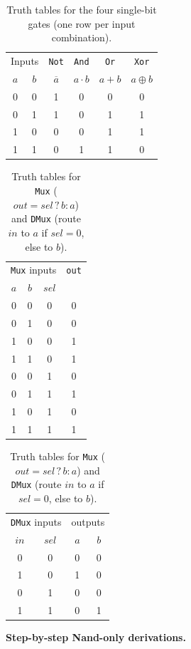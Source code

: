 \documentclass[11pt]{article}
\begin{document}
\begin{table}[h]
\centering
\small
\begin{tabular}{@{}c c | c c c c@{}}
\toprule
\multicolumn{2}{c}{Inputs} & \texttt{Not} & \texttt{And} & \texttt{Or} & \texttt{Xor} \\
$a$ & $b$ & $\overline{a}$ & $a\cdot b$ & $a+b$ & $a\oplus b$ \\
\midrule
0 & 0 & 1 & 0 & 0 & 0 \\
0 & 1 & 1 & 0 & 1 & 1 \\
1 & 0 & 0 & 0 & 1 & 1 \\
1 & 1 & 0 & 1 & 1 & 0 \\
\bottomrule
\end{tabular}
\caption{Truth tables for the four single-bit gates (one row per input combination).}
\label{tab:lab1-gates-tt}
\end{table}

\begin{table}[h]
\centering
\small
\begin{tabular}{@{}c c c | c@{}}
\toprule
\multicolumn{3}{c}{\texttt{Mux} inputs} & \texttt{out} \\
$a$ & $b$ & $sel$ & \\
\midrule
0 & 0 & 0 & 0 \\
0 & 1 & 0 & 0 \\
1 & 0 & 0 & 1 \\
1 & 1 & 0 & 1 \\
0 & 0 & 1 & 0 \\
0 & 1 & 1 & 1 \\
1 & 0 & 1 & 0 \\
1 & 1 & 1 & 1 \\
\bottomrule
\end{tabular}
\quad
\begin{tabular}{@{}c c | c c@{}}
\toprule
\multicolumn{2}{c}{\texttt{DMux} inputs} & \multicolumn{2}{c}{outputs} \\
$in$ & $sel$ & $a$ & $b$ \\
\midrule
0 & 0 & 0 & 0 \\
1 & 0 & 1 & 0 \\
0 & 1 & 0 & 0 \\
1 & 1 & 0 & 1 \\
\bottomrule
\end{tabular}
\caption{Truth tables for \texttt{Mux} ($out=sel\,?\,b:a$) and \texttt{DMux} (route $in$ to $a$ if $sel{=}0$, else to $b$).}
\label{tab:lab1-mux-tt}
\end{table}

\noindent\textbf{Step-by-step Nand-only derivations.}
\end{document}
